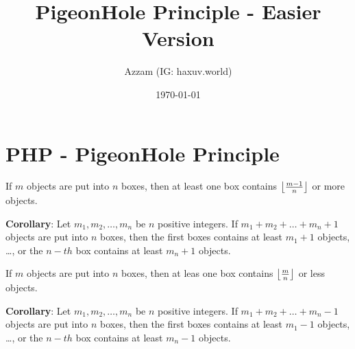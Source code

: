 \documentclass[11pt]{scrartcl}
\title{PigeonHole Principle - Easier Version}
\author{Azzam (IG: haxuv.world)}
\date{\today}
\begin{document}
\maketitle
\section{PHP - PigeonHole Principle}
\begin{definition}
     If $m$ objects are put into $n$ boxes, then at least one box contains $\left\lfloor \frac{m-1}{n} \right\rfloor$ or more objects.
\end{definition}

\textbf{Corollary}: Let $m_1, m_2, \dots, m_n$ be $n$ positive integers. If $m_1+m_2+\dots+m_n+1$ objects are put into $n$ boxes, then the first boxes contains at least $m_1+1$ objects, \dots, or the $n-th$ box contains at least $m_n+1$ objects.

\begin{definition}
    If $m$ objects are put into $n$ boxes, then at leas one box contains $\left\lfloor \frac{m}{n} \right\rfloor$ or less objects.
\end{definition}

\textbf{Corollary}: Let $m_1, m_2, \dots, m_n$ be $n$ positive integers. If $m_1+m_2+\dots+m_n-1$ objects are put into $n$ boxes, then the first boxes contains at least $m_1-1$ objects, \dots, or the $n-th$ box contains at least $m_n-1$ objects.
\end{document}

